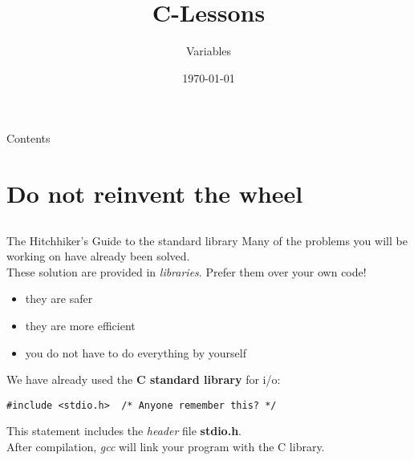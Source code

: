 


\title{C-Lessons}
\subtitle{Variables}
\date{\today}

\usetikzlibrary{tikzmark}


\newcommand{\tikzgraphic}[2]{
\begin{tikzpicture}[scale=#1,font=#2]
	\node (main) [rectangle,draw,inner sep=1em] at (0,0){main.c};
	\node (libc) [rectangle,draw,inner sep=1em] at (5,-3){libc.so};
	\node (stdio) [rectangle,draw,inner sep=1em] at (5,0){stdio.h};
	\node (maino) [rectangle,draw,inner sep=1em] at (0,-3){main.o};
	\node (aout) [rectangle,draw,inner sep=1em] at (2.5,-5){a.out};
	\node at (aout) [above=1.5em] {linking};
	\draw[->] (main) -- (maino) node [left,align=right,midway,text width=5em] {compiling, assembling};
	\draw[->,dotted] (main) -- (stdio) node [above,midway] {includes};
	\draw[->,dotted] (stdio) -- (libc) node [right,midway] {implementation};
	\draw[->] (libc) -- (aout);
	\draw[->] (maino) -- (aout);
\end{tikzpicture}
}



\maketitle

\begin{frame}{Contents}
	\tableofcontents
\end{frame}

\section{Do not reinvent the wheel}
\subsection{}

\begin{frame}[fragile]{The Hitchhiker's Guide to the standard library}
	Many of the problems you will be working on have already been solved.\\
	\bigskip
	These solution are provided in \textit{libraries}. Prefer them over your own code!\\
	\begin{itemize}
		\item they are safer
		\item they are more efficient
		\item you do not have to do everything by yourself
	\end{itemize}
	\bigskip
	We have already used the \textbf{C standard library} for i/o:
\begin{lstlisting}[numbers=none]
#include <stdio.h>	/* Anyone remember this? */
\end{lstlisting}
	This statement includes the \textit{header} file \textbf{stdio.h}.\\
	After compilation, \textit{gcc} will link your program with the C library.\\
\end{frame}

